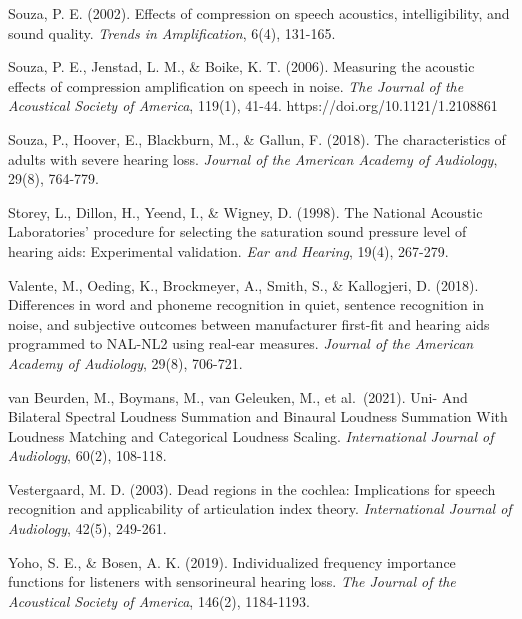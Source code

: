 \documentclass[
  12pt,
]{article}
\begin{document}
Souza, P. E. (2002). Effects of compression on speech acoustics,
intelligibility, and sound quality. \emph{Trends in Amplification},
6(4), 131-165.

Souza, P. E., Jenstad, L. M., \& Boike, K. T. (2006). Measuring the
acoustic effects of compression amplification on speech in noise.
\emph{The Journal of the Acoustical Society of America}, 119(1), 41-44.
https://doi.org/10.1121/1.2108861

Souza, P., Hoover, E., Blackburn, M., \& Gallun, F. (2018). The
characteristics of adults with severe hearing loss. \emph{Journal of the
American Academy of Audiology}, 29(8), 764-779.

Storey, L., Dillon, H., Yeend, I., \& Wigney, D. (1998). The National
Acoustic Laboratories' procedure for selecting the saturation sound
pressure level of hearing aids: Experimental validation. \emph{Ear and
Hearing}, 19(4), 267-279.

Valente, M., Oeding, K., Brockmeyer, A., Smith, S., \& Kallogjeri, D.
(2018). Differences in word and phoneme recognition in quiet, sentence
recognition in noise, and subjective outcomes between manufacturer
first-fit and hearing aids programmed to NAL-NL2 using real-ear
measures. \emph{Journal of the American Academy of Audiology}, 29(8),
706-721.

van Beurden, M., Boymans, M., van Geleuken, M., et al.~(2021). Uni- And
Bilateral Spectral Loudness Summation and Binaural Loudness Summation
With Loudness Matching and Categorical Loudness Scaling.
\emph{International Journal of Audiology}, 60(2), 108-118.

Vestergaard, M. D. (2003). Dead regions in the cochlea: Implications for
speech recognition and applicability of articulation index theory.
\emph{International Journal of Audiology}, 42(5), 249-261.

Yoho, S. E., \& Bosen, A. K. (2019). Individualized frequency importance
functions for listeners with sensorineural hearing loss. \emph{The
Journal of the Acoustical Society of America}, 146(2), 1184-1193.
\end{document}

